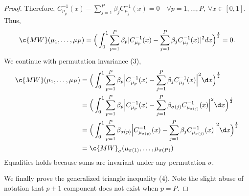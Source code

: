 \documentclass{article}
\begin{document}
\begin{proof}
Therefore, $C_{\mu_p}^{-1}(x)-\sum_{j=1}^P\beta_jC_{\mu_j}^{-1}(x)  = 0 \quad \forall p=1,\ldots,P, \ \forall x \in [0,1]$.
Thus, 
\begin{align}
    &\quad \c{MW}(\mu_1,\ldots,\mu_P)=\Big(\int_0^1\sum_{p=1}^P\beta_p|C_{\mu_p}^{-1}(x)-\sum_{j=1}^P\beta_jC_{\mu_j}^{-1}(x)|^2dx\Big)^{\frac{1}{2}}  =0.
\end{align}
We continue with permutation invariance (3),
\begin{align}
    \c{MW}(\mu_1,\ldots,\mu_P) &= \Big(\int_{0}^1\sum_{p=1}^{P}\beta_p\Big|C_{\mu_p}^{-1}(x)-\sum_{j=1}^P\beta_jC_{\mu_j}^{-1}(x)\Big|^2\d x\Big)^{\frac{1}{2}} \\
    &=\Big(\int_{0}^1\sum_{p=1}^{P}\beta_p\Big|C_{\mu_p}^{-1}(x)-\sum_{j=1}^P\beta_{\sigma(j)}C_{\mu_{\sigma(j)}}^{-1}(x)\Big|^2\d x\Big)^{\frac{1}{2}}
    \\
    &=\Big(\int_{0}^1\sum_{p=1}^{P}\beta_{\sigma(p)}\Big|C_{\mu_{\sigma(p)}}^{-1}(x)-\sum_{j=1}^P\beta_jC_{\mu_{\sigma(j)}}^{-1}(x)\Big|^2\d x\Big)^{\frac{1}{2}}\\
    &=\c{MW}_\sigma(\mu_{\sigma(1)},\ldots,\mu_{\sigma(P)})
\end{align}
Equalities holds because sums are invariant under any permutation $\sigma$.

We finally prove the generalized triangle inequality (4). Note the slight abuse of notation that $p+1$ component does not exist when $p=P$.


\end{proof}
\end{document}
